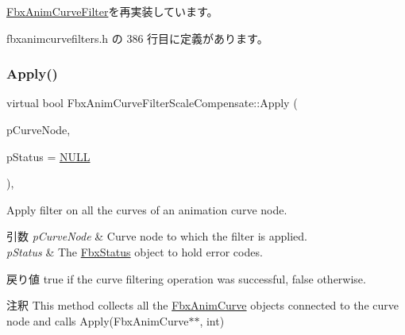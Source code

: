 \hyperlink{class_fbx_anim_curve_filter_a009498a65af4995bf5e5908f17837531}{Fbx\+Anim\+Curve\+Filter}を再実装しています。



 fbxanimcurvefilters.\+h の 386 行目に定義があります。

\mbox{\label{class_fbx_anim_curve_filter_scale_compensate_a1e2bc6474043beb0b41a85b2d70fde76}} 
\subsubsection{\texorpdfstring{Apply()}{Apply()}\hspace{0.1cm}{\footnotesize\ttfamily [3/6]}}
{\footnotesize\ttfamily virtual bool Fbx\+Anim\+Curve\+Filter\+Scale\+Compensate\+::\+Apply (\begin{DoxyParamCaption}\item[{\hyperlink{class_fbx_anim_curve_node}{Fbx\+Anim\+Curve\+Node} \&}]{p\+Curve\+Node,  }\item[{\hyperlink{class_fbx_status}{Fbx\+Status} $\ast$}]{p\+Status = {\ttfamily \hyperlink{fbxarch_8h_a070d2ce7b6bb7e5c05602aa8c308d0c4}{N\+U\+LL}} }\end{DoxyParamCaption})\hspace{0.3cm}{\ttfamily [inline]}, {\ttfamily [virtual]}}

Apply filter on all the curves of an animation curve node. 
\begin{DoxyParams}{引数}
{\em p\+Curve\+Node} & Curve node to which the filter is applied. \\
\hline
{\em p\+Status} & The \hyperlink{class_fbx_status}{Fbx\+Status} object to hold error codes. \\
\hline
\end{DoxyParams}
\begin{DoxyReturn}{戻り値}
{\ttfamily true} if the curve filtering operation was successful, {\ttfamily false} otherwise. 
\end{DoxyReturn}
\begin{DoxyRemark}{注釈}
This method collects all the \hyperlink{class_fbx_anim_curve}{Fbx\+Anim\+Curve} objects connected to the curve node and calls Apply(\+Fbx\+Anim\+Curve$\ast$$\ast$, int) 
\end{DoxyRemark}


